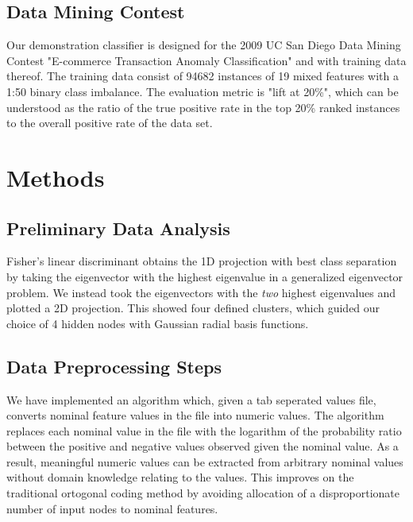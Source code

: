 \documentclass[11pt]{article}       %
\begin{document}
\subsection{Data Mining Contest} \label{contest}
Our demonstration classifier is designed for the 2009 UC San Diego Data Mining Contest "E-commerce Transaction Anomaly Classification" \cite{UCSG-Contest} and with training data thereof. The training data consist of 94682 instances of 19 mixed features with a 1:50 binary class imbalance. The evaluation metric is "lift at 20\%", which can be understood as the ratio of the true positive rate in the top 20\% ranked instances to the overall positive rate of the data set.

\section{Methods} \label{algimp}

\subsection{Preliminary Data Analysis} \label{prelim}
Fisher's linear discriminant \cite[\S 3.8.2]{Duda} obtains the 1D projection with best class separation by taking the eigenvector with the highest eigenvalue in a generalized eigenvector problem. We instead took the eigenvectors with the \emph{two} highest eigenvalues and plotted a 2D projection. This showed four defined clusters, which guided our choice of 4 hidden nodes with Gaussian radial basis functions.

\subsection{Data Preprocessing Steps} \label{preprocessing}
We have implemented an algorithm which, given a tab seperated values file, converts nominal feature values in the file into numeric values.  The algorithm replaces each nominal value in the file with the logarithm of the probability ratio between the positive and negative values observed given the nominal value.  As a result, meaningful numeric values can be extracted from arbitrary nominal values without domain knowledge relating to the values. This improves on the traditional ortogonal coding method \cite[slide 17]{MLP-NominalCoding} by avoiding allocation of a disproportionate number of input nodes to nominal features.
\end{document}
